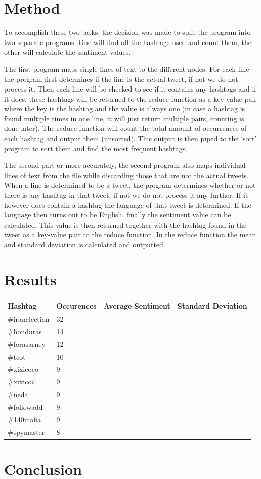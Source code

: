 \documentclass[a4paper,12px]{article}
\begin{document}
\section{Method}

To accomplish these two tasks, the decision was made to split the program into
two separate programs. One will find all the hashtags used and count them, the
other will calculate the sentiment values.

The first program maps single lines of text to the different nodes. For each
line the program first determines if the line is the actual tweet, if not we do
not process it. Then each line will be checked to see if it contains any
hashtags and if it does, these hashtags will be returned to the reduce function as
a key-value pair where the key is the hashtag and the value is always one (in
case a hashtag is found multiple times in one line, it will just return multiple
pairs, counting is done later). The reduce function will count the total amount
of occurrences of each hashtag and output them (unsorted). This output is then
piped to the `sort' program to sort them and find the most frequent hashtags.

The second part or more accurately, the second program also maps individual
lines of text from the file while discarding those that are not the actual
tweets. When a line is determined to be a tweet, the program determines whether
or not there is any hashtag in that tweet, if not we do not process it any
further. If it however does contain a hashtag the language of that tweet is
determined. If the language then turns out to be English, finally the sentiment
value can be calculated. This value is then returned together with the hashtag
found in the tweet as a key-value pair to the reduce function. In the reduce
function the mean and standard deviation is calculated and outputted.

\section{Results}

\noindent\begin{tabularx}{\textwidth}{p{} p{} p{} p{}}
    Hashtag & Occurences & Average Sentiment & Standard Deviation \\
    \hline
    \#iranelection  & 32 &  &  \\
    \#honduras      & 14 &  &  \\
    \#forasarney    & 12 &  &  \\
    \#tcot          & 10 &  &  \\
    \#xixicoco      & 9  &  &  \\
    \#xixicoc       & 9  &  &  \\
    \#neda          & 9  &  &  \\
    \#followadd     & 9  &  &  \\
    \#140mafia      & 9  &  &  \\
    \#spymaster     & 8  &  &  \\
\end{tabularx}

\section{Conclusion}



%
%
\end{document}
